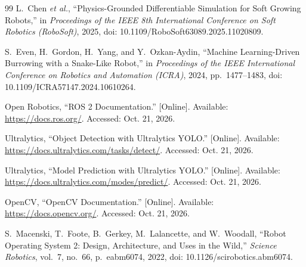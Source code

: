 \begin{thebibliography}{99}
L.~Chen \textit{et al.}, ``Physics-Grounded Differentiable Simulation for Soft Growing Robots,'' in \textit{Proceedings of the IEEE 8th International Conference on Soft Robotics (RoboSoft)}, 2025, doi: 10.1109/RoboSoft63089.2025.11020809.

S.~Even, H.~Gordon, H.~Yang, and Y.~Ozkan-Aydin, ``Machine Learning-Driven Burrowing with a Snake-Like Robot,'' in \textit{Proceedings of the IEEE International Conference on Robotics and Automation (ICRA)}, 2024, pp.~1477--1483, doi: 10.1109/ICRA57147.2024.10610264.

Open Robotics, ``ROS 2 Documentation.'' [Online]. Available: \url{https://docs.ros.org/}. Accessed: Oct. 21, 2026.

Ultralytics, ``Object Detection with Ultralytics YOLO.'' [Online]. Available: \url{https://docs.ultralytics.com/tasks/detect/}. Accessed: Oct. 21, 2026.

Ultralytics, ``Model Prediction with Ultralytics YOLO.'' [Online]. Available: \url{https://docs.ultralytics.com/modes/predict/}. Accessed: Oct. 21, 2026.

OpenCV, ``OpenCV Documentation.'' [Online]. Available: \url{https://docs.opencv.org/}. Accessed: Oct. 21, 2026.

S.~Macenski, T.~Foote, B.~Gerkey, M.~Lalancette, and W.~Woodall, ``Robot Operating System 2: Design, Architecture, and Uses in the Wild,'' \textit{Science Robotics}, vol.~7, no.~66, p.~eabm6074, 2022, doi: 10.1126/scirobotics.abm6074.

\end{thebibliography}
